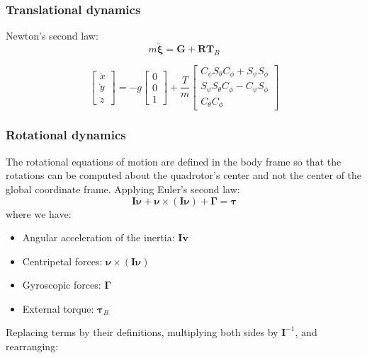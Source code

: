 \subsubsection{Translational dynamics}

Newton's second law: 
$$m \ddot{\boldsymbol{\xi}}=\boldsymbol{G}+\boldsymbol{R} \boldsymbol{T}_{B}$$

$$\left[ \begin{array}{c}{\ddot{x}} \\ {\ddot{y}} \\ {\ddot{z}}\end{array}\right]=-g \left[ \begin{array}{l}{0} \\ {0} \\ {1}\end{array}\right]+\frac{T}{m} \left[ \begin{array}{c}{C_{\psi} S_{\theta} C_{\phi}+S_{\psi} S_{\phi}} \\ {S_{\psi} S_{\theta} C_{\phi}-C_{\psi} S_{\phi}} \\ {C_{\theta} C_{\phi}}\end{array}\right]$$

\subsubsection{Rotational dynamics}
The rotational equations of motion are defined in the body frame so that the rotations can be computed about the quadrotor’s center and not the center of the global coordinate frame.
Applying Euler's second law:
$$\boldsymbol{I} \dot{\boldsymbol{\nu}}+\boldsymbol{\nu} \times(\boldsymbol{I} \boldsymbol{\nu})+\mathbf{\Gamma}=\boldsymbol{\tau}$$
where we have:
\begin{itemize}
  \item Angular acceleration of the inertia: $\boldsymbol{I\dot{v}}$
  \item Centripetal forces: $\boldsymbol{\nu}\times(\boldsymbol{I \nu})$
  \item Gyroscopic forces: $\boldsymbol{\Gamma}$
  \item External torque: $\boldsymbol{\tau}_B$
\end{itemize}

Replacing terms by their definitions, multiplying both sides by $\boldsymbol{I}^{-1}$, and rearranging:

